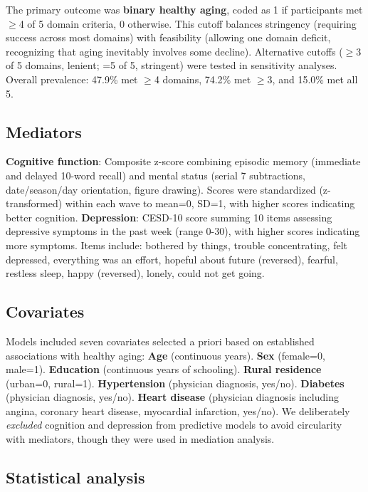 \documentclass[10pt]{article}
\begin{document}
The primary outcome was \textbf{binary healthy aging}, coded as 1 if participants met $\geq$4 of 5 domain criteria, 0 otherwise. This cutoff balances stringency (requiring success across most domains) with feasibility (allowing one domain deficit, recognizing that aging inevitably involves some decline). Alternative cutoffs ($\geq$3 of 5 domains, lenient; =5 of 5, stringent) were tested in sensitivity analyses. Overall prevalence: 47.9\% met $\geq$4 domains, 74.2\% met $\geq$3, and 15.0\% met all 5.

\subsection*{Mediators}

\textbf{Cognitive function}: Composite z-score combining episodic memory (immediate and delayed 10-word recall) and mental status (serial 7 subtractions, date/season/day orientation, figure drawing). Scores were standardized (z-transformed) within each wave to mean=0, SD=1, with higher scores indicating better cognition. \textbf{Depression}: CESD-10 score summing 10 items assessing depressive symptoms in the past week (range 0-30), with higher scores indicating more symptoms. Items include: bothered by things, trouble concentrating, felt depressed, everything was an effort, hopeful about future (reversed), fearful, restless sleep, happy (reversed), lonely, could not get going.

\subsection*{Covariates}

Models included seven covariates selected a priori based on established associations with healthy aging: \textbf{Age} (continuous years). \textbf{Sex} (female=0, male=1). \textbf{Education} (continuous years of schooling). \textbf{Rural residence} (urban=0, rural=1). \textbf{Hypertension} (physician diagnosis, yes/no). \textbf{Diabetes} (physician diagnosis, yes/no). \textbf{Heart disease} (physician diagnosis including angina, coronary heart disease, myocardial infarction, yes/no). We deliberately \textit{excluded} cognition and depression from predictive models to avoid circularity with mediators, though they were used in mediation analysis.

\subsection*{Statistical analysis}
\end{document}
